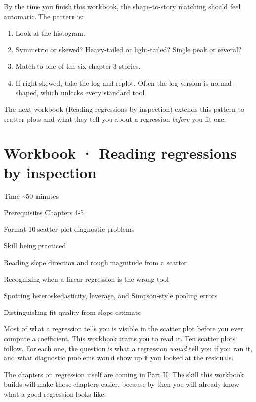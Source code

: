 \documentclass[
  letterpaper,
  11pt,
  twoside,
  openany]{scrbook}
\providecommand{\tightlist}{%
  \setlength{\itemsep}{0pt}\setlength{\parskip}{0pt}}
\begin{document}
By the time you finish this workbook, the shape-to-story matching should
feel automatic. The pattern is:

\begin{enumerate}
\def\labelenumi{\arabic{enumi}.}
\tightlist
\item
  Look at the histogram.
\item
  Symmetric or skewed? Heavy-tailed or light-tailed? Single peak or
  several?
\item
  Match to one of the six chapter-3 stories.
\item
  If right-skewed, take the log and replot. Often the log-version is
  normal-shaped, which unlocks every standard tool.
\end{enumerate}

The next workbook (Reading regressions by inspection) extends this
pattern to scatter plots and what they tell you about a regression
\emph{before} you fit one.

\chapter{Workbook · Reading regressions by
inspection}\label{workbook-reading-regressions-by-inspection}

{Time} {\textasciitilde50 minutes}

{Prerequisites} {Chapters 4-5}

{Format} {10 scatter-plot diagnostic problems}

{Skill being practiced}

Reading slope direction and rough magnitude from a scatter

Recognizing when a linear regression is the wrong tool

Spotting heteroskedasticity, leverage, and Simpson-style pooling errors

Distinguishing fit quality from slope estimate

Most of what a regression tells you is visible in the scatter plot
before you ever compute a coefficient. This workbook trains you to read
it. Ten scatter plots follow. For each one, the question is what a
regression \emph{would} tell you if you ran it, and what diagnostic
problems would show up if you looked at the residuals.

The chapters on regression itself are coming in Part II. The skill this
workbook builds will make those chapters easier, because by then you
will already know what a good regression looks like.
\end{document}
